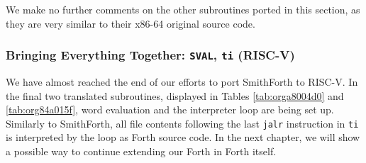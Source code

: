 \documentclass[a4paper,12pt,final]{article}
\begin{document}
\begin{table}[!htbp]
\begin{adjustwidth}{-1cm}{-1cm}
\begin{center}
\end{center}
\normalsize \end{adjustwidth} \end{table} \vspace{0}

We make no further comments on the other subroutines ported in this
section, as they are very similar to their x86-64 original source
code.

\subsubsection{Bringing Everything Together: \texttt{SVAL}, \texttt{ti} (RISC-V)}
\label{sec:org3773e57}

We have almost reached the end of our efforts to port SmithForth to
RISC-V.  In the final two translated subroutines, displayed in Tables
\ref{tab:orga8004d0} and \ref{tab:org84a015f}, word evaluation and the
interpreter loop are being set up.  Similarly to SmithForth, all file
contents following the last \texttt{jalr} instruction in \texttt{ti} is interpreted
by the loop as Forth source code.  In the next chapter, we will show a
possible way to continue extending our Forth in Forth itself.
\end{document}
